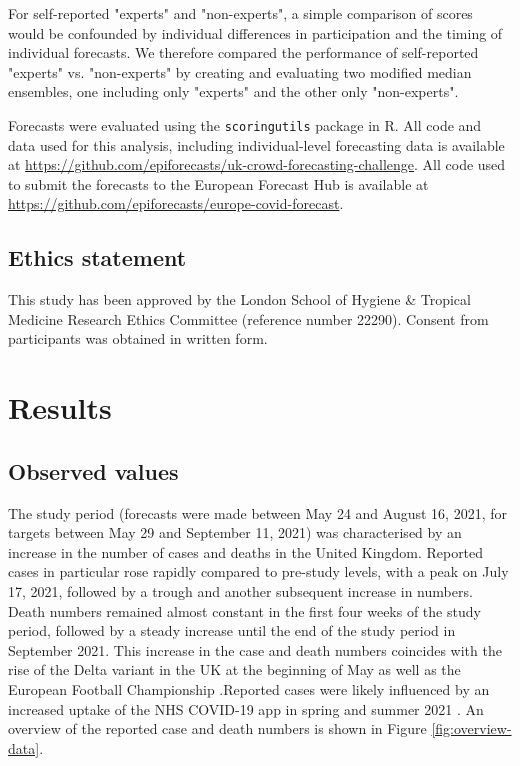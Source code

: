 \documentclass[10pt,a4paper,twocolumn]{article}
\begin{document}
For self-reported "experts" and "non-experts", a simple comparison of scores would be confounded by individual differences in participation and the timing of individual forecasts. We therefore compared the performance of self-reported "experts" vs. "non-experts" by creating and evaluating two modified median ensembles, one including only "experts" and the other only "non-experts".


Forecasts were evaluated using the \texttt{scoringutils} \citep{bosseEvaluatingForecastsScoringutils2022} package in \textsf{R}. All code and data used for this analysis, including individual-level forecasting data is available at \url{https://github.com/epiforecasts/uk-crowd-forecasting-challenge}. All code used to submit the forecasts to the European Forecast Hub is available at \url{https://github.com/epiforecasts/europe-covid-forecast}. 

\subsection*{Ethics statement}
This study has been approved by the London School of Hygiene \& Tropical Medicine Research Ethics Committee (reference number 22290). Consent from participants was obtained in written form.



\section*{Results}

\subsection*{Observed values}

The study period (forecasts were made between May 24 and August 16, 2021, for targets between May 29 and September 11, 2021) was characterised by an increase in the number of cases and deaths in the United Kingdom. Reported cases in particular rose rapidly compared to pre-study levels, with a peak on July 17, 2021, followed by a trough and another subsequent increase in numbers. Death numbers remained almost constant in the first four weeks of the study period, followed by a steady increase until the end of the study period in September 2021. This increase in the case and death numbers coincides with the rise of the Delta variant in the UK at the beginning of May \citep{bastIncreasedRiskHospitalisation2021, perez-guzmanEpidemiologicalDriversTransmissibility2023} as well as the  European Football Championship \citep{dehningImpactEuro20202023}.Reported cases were likely influenced by an increased uptake of the NHS COVID-19 app in spring and summer 2021 \citep{kendallEpidemiologicalImpactsNHS2023}. An overview of the reported case and death numbers is shown in Figure \ref{fig:overview-data}. 
\end{document}
